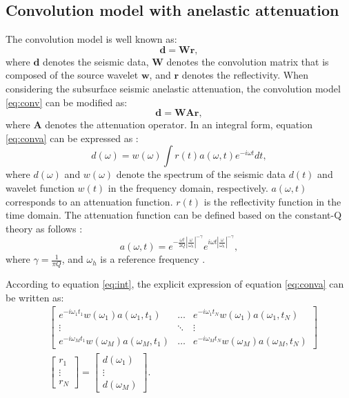 \subsection{Convolution model with anelastic attenuation}
The convolution model is well known as:
\begin{equation}
\label{eq:conv}
\mathbf{d} = \mathbf{Wr},
\end{equation}
where $\mathbf{d}$ denotes the seismic data, $\mathbf{W}$ denotes the convolution matrix that is composed of the source wavelet $\mathbf{w}$, and $\mathbf{r}$ denotes the reflectivity. When considering the subsurface seismic anelastic attenuation, the convolution model \ref{eq:conv} can be modified as:
\begin{equation}
\label{eq:conva}
\mathbf{d} = \mathbf{WAr},
\end{equation}
where $\mathbf{A}$ denotes the attenuation operator. In an integral form, equation \ref{eq:conva} can be expressed as \cite{margrave2011gabor,yufeng2018l12}:
\begin{equation}
\label{eq:int}
d(\omega) = w(\omega) \int r(t)a(\omega,t)e^{-i\omega t}dt,
\end{equation}
where $d(\omega)$ and $w(\omega)$ denote the spectrum of the seismic data $d(t)$ and wavelet function $w(t)$ in the frequency domain, respectively. $a(\omega,t)$ corresponds to an attenuation function. $r(t)$ is the reflectivity function in the time domain. The attenuation function can be defined based on the constant-Q theory as follows \cite{zhu2014q,yufeng2018l12}:
\begin{equation}
\label{eq:af}
a(\omega, t) = e^{-\frac{\omega t}{2Q}\left | \frac{\omega}{\omega_h} \right |^{-\gamma}}e^{i \omega t \left | \frac{\omega}{\omega_h} \right |^{-\gamma}},
\end{equation}
where $\gamma=\frac{1}{\pi Q}$, and $\omega_h$ is a reference frequency . 

According to equation \ref{eq:int}, the explicit expression of equation \ref{eq:conva} can be written as:
\begin{equation}
\label{eq:exp}
\begin{split}
&\left[ \begin{array}{ccc}
e^{-i \omega_1 t_1}w(\omega_1)a(\omega_1, t_1) & \ldots & e^{-i \omega_1 t_N}w(\omega_1)a(\omega_1, t_N) \\
\vdots & \ddots & \vdots \\
e^{-i \omega_M t_1}w(\omega_M)a(\omega_M, t_1) & \ldots & e^{-i \omega_M t_N}w(\omega_M)a(\omega_M, t_N)
\end{array} \right] \\
&\left[\begin{array}{c} r_1 \\ \vdots \\ r_N \end{array} \right] = \left[\begin{array}{c} d(\omega_1) \\ \vdots \\ d(\omega_M) \end{array} \right] .
\end{split}
\end{equation}

